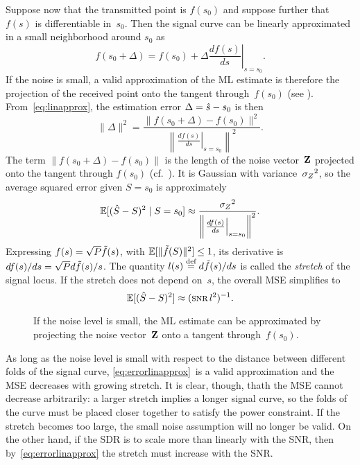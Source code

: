 Suppose now that the transmitted point is $f(s_0)$ and suppose further that
$f(s)$ is differentiable in~$s_0$. Then the signal curve can be linearly
approximated in a small neighborhood around $s_0$ as
\begin{equation}
  \label{eq:linapprox}
  f(s_0 + \Delta) = f(s_0) + \Delta \left. \frac{df(s)}{ds}\right|_{s = s_0}.
\end{equation}
If the noise is small, a valid approximation of the ML estimate is therefore
the projection of the received point onto the tangent through~$f(s_0)$ (see
). From~\eqref{eq:linapprox}, the estimation error $\Delta =
{\hat{s}} - s_0$ is then
\begin{equation*}
  \| \Delta \|^2 = \frac{\| f(s_0 + \Delta) - f(s_0) \|^2}
  {\left\| \left. \frac{d f(s)}{ds} \right|_{s = s_0} \right\|^2}.
\end{equation*}
The term $\| f(s_0 + \Delta) - f(s_0) \|$ is the length of the noise
vector~$\mathbf{Z}$ projected onto the tangent through $f(s_0)$
(cf.~). It is Gaussian with variance~${{\sigma_Z}^2}$, so the average
squared error given $S = s_0$ is approximately
\begin{equation}
  \label{eq:errorlinapprox}
  \mathbb{E}[({\hat{S}} - S)^2 \mid S = s_0] \approx \frac{{{\sigma_Z}^2}}{\left\| \left. \frac{df(s)}{ds}
  \right|_{s=s_0} \right\|^2}.
\end{equation}
Expressing $f(s) = \sqrt{P} \tilde{f}(s)$, with $\mathbb{E}[\|\tilde{f}(S)\|^2] \le 1$, its
derivative is
$df(s)/ds = \sqrt{P} d\tilde{f}(s)/s$. The quantity $l(s) \stackrel{\text{def}}{=} d\tilde{f}(s)/ds$ is called
the \emph{stretch} of the signal locus. If the stretch does not depend on~$s$,
the overall MSE simplifies to
\begin{equation}
  \label{eq:constantstretch}
  \mse \approx (\snr l^2)^{-1}.
\end{equation}

\begin{figure}
  \begin{center}
    
  \end{center}
  \caption{If the noise level is small, the ML estimate can be approximated
  by projecting the noise vector~$\mathbf{Z}$ onto a tangent through~$f(s_0)$.}
  \label{fig:tangentproj}
\end{figure}

As long as the noise level is small with respect to the distance between
different folds of the signal curve, \eqref{eq:errorlinapprox}~is a valid
approximation and the MSE decreases with growing stretch. It is clear, though,
thath the MSE cannot decrease arbitrarily: a larger stretch implies a longer
signal curve, so the folds of the curve must be placed closer together to
satisfy the power constraint. If the stretch becomes too large, the small noise
assumption will no longer be valid.  On the other hand, if the SDR is to scale
more than linearly with the SNR, then by~\eqref{eq:errorlinapprox} the stretch
must increase with the SNR.

